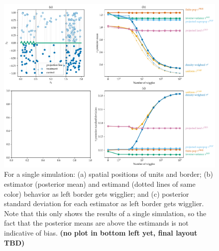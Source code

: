 \documentclass[letter]{article}
\makeatletter
\def\maxwidth{\ifdim\Gin@nat@width>\linewidth\linewidth
\else\Gin@nat@width\fi}
\let\Oldincludegraphics\includegraphics
\renewcommand{\includegraphics}[1]{\Oldincludegraphics[width=0.9\maxwidth]{#1}}
\makeatother
\begin{document}
    	\begin{figure}
\centering
\includegraphics{../figures/wiggly_boundaries.png}
\caption{\label{fig:wiggly_boundaries} For a single simulation: (a) spatial positions of units and border; (b) estimator (posterior mean) and estimand (dotted lines of same color) behavior as left border gets wigglier; and (c) posterior standard deviation for each estimator as left border gets wigglier. Note that this only shows the results of a single simulation, so the fact that the posterior means are above the estimands is not indicative of bias. \textbf{(no plot in bottom left yet, final layout TBD)}}
\end{figure}
    
\end{document}
